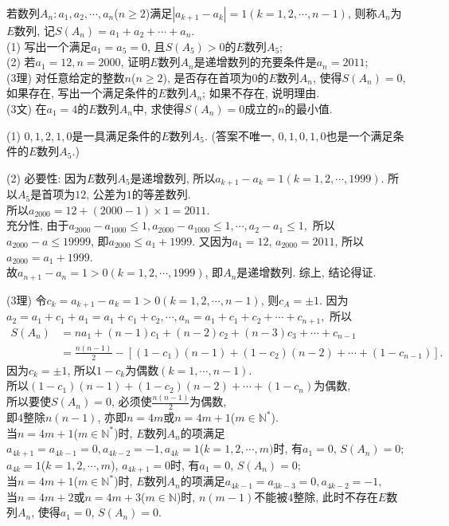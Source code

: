 \documentclass[green]{lsbook}
\begin{document}
\begin{tcolorbox}[applelight,title={2011.20(本小题13分)}]
若数列$A_n: a_1, a_2, \cdots, a_n$($n\geq 2$)满足$|a_{k+1}-a_k|=1(k=1,2,\cdots,n-1)$, 则称$A_n$为$E$数列, 记$S(A_n)=a_1+a_2+\cdots+a_n$.\\
(1) 写出一个满足$a_1=a_5=0$, 且$S(A_5)>0$的$E$数列$A_5$;\\
(2) 若$a_1=12, n=2000$, 证明$E$数列$A_n$是递增数列的充要条件是$a_n =2011$;\\
(3理) 对任意给定的整数$n$($n\geq 2$), 是否存在首项为$0$的$E$数列$A_n$, 使得$S(A_n)=0$, 如果存在, 写出一个满足条件的$E$数列$A_n$; 如果不存在, 说明理由.\\
(3文) 在$a_1=4$的$E$数列$A_n$中, 求使得$S(A_n)=0$成立的$n$的最小值.
\end{tcolorbox}

(1) $0, 1, 2, 1, 0$是一具满足条件的$E$数列$A_5$.
(答案不唯一, $0, 1, 0, 1, 0$也是一个满足条件的$E$数列$A_5$.)

(2) 必要性: 因为$E$数列$A_5$是递增数列, 
所以$a_{k+1}-a_k=1(k=1,2,\cdots,1999)$.
所以$A_5$是首项为$12$, 公差为$1$的等差数列.\\
所以$a_{2000}=12+(2000-1)\times 1=2011$.\\
充分性, 由于$a_{2000}-a_{1000}\leq 1, 
a_{2000}-a_{1000}\leq 1,
\cdots,
a_2-a_1\leq 1,$
所以$a_{2000}-a\leq 19999$, 即$a_{2000}\leq a_1+1999$. 
又因为$a_1=12$, $a_{2000}=2011$,
所以$a_{2000}=a_1+1999$.\\
故$a_{n+1}-a_n=1>0(k=1,2,\cdots,1999)$, 即$A_n$是递增数列.
综上, 结论得证.

(3理) 令$c_k=a_{k+1}-a_k=1>0(k=1,2,\cdots,n-1)$, 则$c_A=\pm 1$.
	因为
$a_2 =a_1+c_1+a_1=a_1+c_1+c_2,\cdots,
a_n=a_1+c_1+c_2+\cdots +c_{n+1},$
所以
\begin{align*}
S(A_n)&=na_1+(n-1)c_1+(n-2)c_2+(n-3)c_3+\cdots +c_{n-1}\\
&=\frac{n(n-1)}{2}-[(1-c_1)(n-1)+(1-c_2)(n-2)+\cdots +(1-c_{n-1})].
\end{align*}
因为$c_k=\pm 1$, 所以$1-c_k$为偶数$(k=1,\cdots,n-1)$.\\
所以$(1-c_1)(n-1)+(1-c_2)(n-2)+\cdots +(1-c_n)$为偶数,\\
所以要使$S(A_n)=0$, 必须使$\frac{n(n-1)}{2}$为偶数,\\
即$4$整除$n(n-1)$, 亦即$n=4m$或$n=4m+1$($m\in \mathbb{N}^*$).\\
当$n=4m+1$($m\in \mathbb{N}^*$)时, $E$数列$A_n$的项满足$a_{4k+1}=a_{4k-1}=0, a_{4k-2}=-1, a_{4k}=1$($k=1,2,\cdots,m)$时, 有$a_1=0$, $S(A_n)=0$;\\
$a_{4k}=1$($k=1,2,\cdots,m$), $a_{4k+1}=0$时, 有$a_1=0$, $S(A_n)=0$;\\
当$n=4m+1$($m\in \mathbb{N}^*$)时, $E$数列$A_n$的项满足$a_{4k-1}=a_{3k-3}=0, a_{4k-2}=-1,$\\
当$n=4m+2$或$n=4m+3$($m\in \mathbb{N}$)时, $n(m-1)$不能被$4$整除, 此时不存在$E$数列$A_n$, 
使得$a_1=0$, $S(A_n)=0$.
\end{document}
